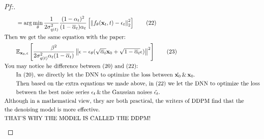 \documentclass{article}
\begin{document}
\begin{proof}[\textit{Pf:}]
\begin{align}
        &\qquad = \arg\min_{\theta} \frac{1}{2\sigma_{q(t)}^2} \frac{(1-\alpha_t)^2}{(1-\overline{\alpha}_t)\alpha_t}
        \left[ \left\lVert f_{\theta}(\mathbf{x}_t, t)- \epsilon_t \right\rVert^2_2 \right] \tag{22} \\
        &\text{Then we get the same equation with the paper: }  \notag \\
        &\qquad \mathbb{E}_{\mathbf{x}_0,\epsilon} \left[ \frac{\beta^2}{2\sigma_{q(t)}^2\alpha_t(1-\overline{\alpha}_t)} 
        \left\lVert \epsilon - \epsilon_{\theta}(\sqrt{\overline{\alpha}_t}\mathbf{x}_0 + \sqrt{1 - \overline{\alpha}_t}\epsilon) \right\rVert^2 \right]  \tag{23} \\
        &\text{You may notice he difference between (20) and (22):}  \notag \\
        &\qquad \text{In (20), we directly let the DNN to optimize the loss between }\hat{\mathbf{x}_0} \,\&\, \mathbf{x}_0 \text{.} \notag \\
        &\qquad \text{Then based on the extra equations we made above, in (22) we let the DNN to optimize the loss} \notag \\
        &\qquad \text{between the best noise series }\epsilon_t \,\&\, \text{the Gaussian noises }\hat{\epsilon_t} \text{.} \notag \\
        &\text{Although in a mathematical view, they are both practical, the writers of DDPM find that the } \notag \\
        &\text{the denoising model is more effective.} \notag \\
        &\text{THAT'S WHY THE MODEL IS CALLED THE DDPM!} \notag
    \end{align}
\end{proof}
\end{document}
